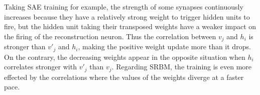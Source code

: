 Taking SAE training for example, the strength of some synapses continuously increases because they have a relatively strong weight to trigger hidden units to fire, but the hidden unit taking their transposed weights have a weaker impact on the firing of the reconstruction neuron.
Thus the correlation between $v_j$ and $h_i$ is stronger than $v'_j$ and $h_i$, making the positive weight update more \DIFdelbegin {}\DIFdelend \DIFaddbegin {}\DIFaddend than it drops.
On the contrary, the decreasing weights appear in the opposite situation when $h_i$ correlates stronger with $v'_j$ than $v_j$.
Regarding \DIFdelbegin {}\DIFdelend \DIFaddbegin {}\DIFaddend SRBM, the training is even more effected by the correlations where the values of the weights diverge at a faster pace.

